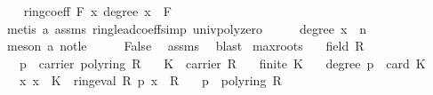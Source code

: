 \begin{isabellebody}
\ \ \isamarkupfalse%
\ {\isachardoublequoteopen}ring{\isachardot}{\kern0pt}coeff\ F\ x\ {\isacharparenleft}{\kern0pt}degree\ x{\isacharparenright}{\kern0pt}\ {\isasymnoteq}\ {\isasymzero}\isactrlbsub F\isactrlesub {\isachardoublequoteclose}\ \isanewline
\ \ \ \ \isamarkupfalse%
\ {\isacharparenleft}{\kern0pt}metis\ a\ assms{\isacharparenleft}{\kern0pt}{}{\isacharparenright}{\kern0pt}\ ring{\isachardot}{\kern0pt}lead{\isacharunderscore}{\kern0pt}coeff{\isacharunderscore}{\kern0pt}simp\ univ{\isacharunderscore}{\kern0pt}poly{\isacharunderscore}{\kern0pt}zero{\isacharparenright}{\kern0pt}\isanewline
\ \ \isamarkupfalse%
\ \isamarkupfalse%
\ {\isachardoublequoteopen}degree\ x\ {\isasymge}\ n{\isachardoublequoteclose}\ \isamarkupfalse%
\ {\isacharparenleft}{\kern0pt}meson\ a\ not{\isacharunderscore}{\kern0pt}le{\isacharparenright}{\kern0pt}\isanewline
\ \ \isamarkupfalse%
\ \isamarkupfalse%
\ {\isachardoublequoteopen}False{\isachardoublequoteclose}\ \isamarkupfalse%
\ assms{\isacharparenleft}{\kern0pt}{}{\isacharparenright}{\kern0pt}\ \isamarkupfalse%
\ blast\isanewline
{}\isamarkupfalse%
%
\endisatagproof
{\isafoldproof}%
%
\isadelimproof
\isanewline
%
\endisadelimproof
\isanewline
{}\isamarkupfalse%
\ max{\isacharunderscore}{\kern0pt}roots{\isacharcolon}{\kern0pt}\isanewline
\ \ \ {\isachardoublequoteopen}field\ R{\isachardoublequoteclose}\isanewline
\ \ \ {\isachardoublequoteopen}p\ {\isasymin}\ carrier\ {\isacharparenleft}{\kern0pt}poly{\isacharunderscore}{\kern0pt}ring\ R{\isacharparenright}{\kern0pt}{\isachardoublequoteclose}\isanewline
\ \ \ {\isachardoublequoteopen}K\ {\isasymsubseteq}\ carrier\ R{\isachardoublequoteclose}\isanewline
\ \ \ {\isachardoublequoteopen}finite\ K{\isachardoublequoteclose}\isanewline
\ \ \ {\isachardoublequoteopen}degree\ p\ {\isacharless}{\kern0pt}\ card\ K{\isachardoublequoteclose}\isanewline
\ \ \ {\isachardoublequoteopen}{\isasymAnd}x{\isachardot}{\kern0pt}\ x\ {\isasymin}\ K\ {\isasymLongrightarrow}\ ring{\isachardot}{\kern0pt}eval\ R\ p\ x\ {\isacharequal}{\kern0pt}\ {\isasymzero}\isactrlbsub R\isactrlesub {\isachardoublequoteclose}\isanewline
\ \ \ {\isachardoublequoteopen}p\ {\isacharequal}{\kern0pt}\ {\isasymzero}\isactrlbsub poly{\isacharunderscore}{\kern0pt}ring\ R\isactrlesub {\isachardoublequoteclose}\isanewline

\end{isabellebody}
